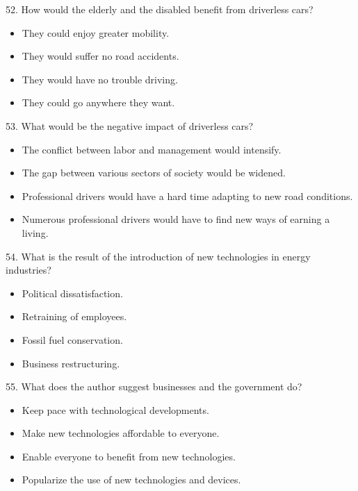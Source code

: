 \documentclass[UTF8,11pt]{ctexart}
\begin{document}
52. How would the elderly and the disabled benefit from driverless cars?


\begin{itemize}[leftmargin=2em,itemsep=.2em,topsep=.4em]\item[A.] They could enjoy greater mobility.
\item[B.] They would suffer no road accidents.
\end{itemize}

\begin{itemize}[leftmargin=2em,itemsep=.2em,topsep=.4em]\item[C.] They would have no trouble driving.
\item[D.] They could go anywhere they want.
\end{itemize}

53. What would be the negative impact of driverless cars?


\begin{itemize}[leftmargin=2em,itemsep=.2em,topsep=.4em]\item[A.] The conflict between labor and management would intensify.
\item[B.] The gap between various sectors of society would be widened.
\item[C.] Professional drivers would have a hard time adapting to new road conditions.
\item[D.] Numerous professional drivers would have to find new ways of earning a living.
\end{itemize}

54. What is the result of the introduction of new technologies in energy industries?


\begin{itemize}[leftmargin=2em,itemsep=.2em,topsep=.4em]\item[A.] Political dissatisfaction.
\item[B.] Retraining of employees.
\item[C.] Fossil fuel conservation.
\item[D.] Business restructuring.
\end{itemize}

55. What does the author suggest businesses and the government do?


\begin{itemize}[leftmargin=2em,itemsep=.2em,topsep=.4em]\item[A.] Keep pace with technological developments.
\item[B.] Make new technologies affordable to everyone.
\item[C.] Enable everyone to benefit from new technologies.
\item[D.] Popularize the use of new technologies and devices.
\end{itemize}
\end{document}
